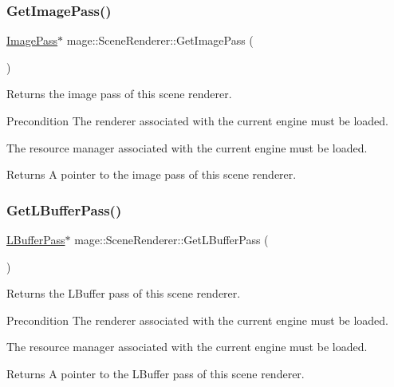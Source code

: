 \subsubsection{\texorpdfstring{Get\+Image\+Pass()}{GetImagePass()}}
{\footnotesize\ttfamily \hyperlink{classmage_1_1_image_pass}{Image\+Pass}$\ast$ mage\+::\+Scene\+Renderer\+::\+Get\+Image\+Pass (\begin{DoxyParamCaption}{ }\end{DoxyParamCaption})}

Returns the image pass of this scene renderer.

\begin{DoxyPrecond}{Precondition}
The renderer associated with the current engine must be loaded. 

The resource manager associated with the current engine must be loaded. 
\end{DoxyPrecond}
\begin{DoxyReturn}{Returns}
A pointer to the image pass of this scene renderer. 
\end{DoxyReturn}
\hypertarget{classmage_1_1_scene_renderer_a19c08ea8c46fac8ca0fcef156f4a0488}{}\label{classmage_1_1_scene_renderer_a19c08ea8c46fac8ca0fcef156f4a0488} 
\subsubsection{\texorpdfstring{Get\+L\+Buffer\+Pass()}{GetLBufferPass()}}
{\footnotesize\ttfamily \hyperlink{structmage_1_1_l_buffer_pass}{L\+Buffer\+Pass}$\ast$ mage\+::\+Scene\+Renderer\+::\+Get\+L\+Buffer\+Pass (\begin{DoxyParamCaption}{ }\end{DoxyParamCaption})}

Returns the L\+Buffer pass of this scene renderer.

\begin{DoxyPrecond}{Precondition}
The renderer associated with the current engine must be loaded. 

The resource manager associated with the current engine must be loaded. 
\end{DoxyPrecond}
\begin{DoxyReturn}{Returns}
A pointer to the L\+Buffer pass of this scene renderer. 
\end{DoxyReturn}
\hypertarget{classmage_1_1_scene_renderer_a5982de896a340dd69c26496f186a0094}{}\label{classmage_1_1_scene_renderer_a5982de896a340dd69c26496f186a0094} 
